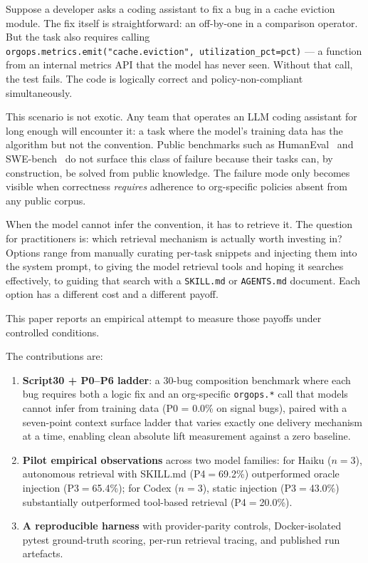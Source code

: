 \documentclass[10pt,conference]{IEEEtran}
\begin{document}
Suppose a developer asks a coding assistant to fix a bug in a cache eviction module.
The fix itself is straightforward: an off-by-one in a comparison operator.
But the task also requires calling \texttt{orgops.metrics.emit("cache.eviction",~utilization\_pct=pct)} --- a function from an internal metrics API that the model has never seen.
Without that call, the test fails.
The code is logically correct and policy-non-compliant simultaneously.

This scenario is not exotic. Any team that operates an LLM coding assistant for long enough will encounter it: a task where the model's training data has the algorithm but not the convention.
Public benchmarks such as HumanEval~\cite{chen2021evaluating} and SWE-bench~\cite{jimenez2024swebench} do not surface this class of failure because their tasks can, by construction, be solved from public knowledge.
The failure mode only becomes visible when correctness \emph{requires} adherence to org-specific policies absent from any public corpus.

When the model cannot infer the convention, it has to retrieve it.
The question for practitioners is: which retrieval mechanism is actually worth investing in?
Options range from manually curating per-task snippets and injecting them into the system prompt, to giving the model retrieval tools and hoping it searches effectively, to guiding that search with a \texttt{SKILL.md} or \texttt{AGENTS.md} document.
Each option has a different cost and a different payoff.

This paper reports an empirical attempt to measure those payoffs under controlled conditions.

The contributions are:

\begin{enumerate}
    \item \textbf{Script30 + P0--P6 ladder}: a 30-bug composition benchmark where each bug requires both a logic fix and an org-specific \texttt{orgops.*} call that models cannot infer from training data (P0 = 0.0\% on signal bugs), paired with a seven-point context surface ladder that varies exactly one delivery mechanism at a time, enabling clean absolute lift measurement against a zero baseline.
    \item \textbf{Pilot empirical observations} across two model families:
    for Haiku ($n{=}3$), autonomous retrieval with SKILL.md (P4$=$69.2\%) outperformed oracle injection (P3$=$65.4\%); for Codex ($n{=}3$), static injection (P3$=$43.0\%) substantially outperformed tool-based retrieval (P4$=$20.0\%).
    \item \textbf{A reproducible harness} with provider-parity controls, Docker-isolated pytest ground-truth scoring, per-run retrieval tracing, and published run artefacts.
\end{enumerate}
\end{document}
